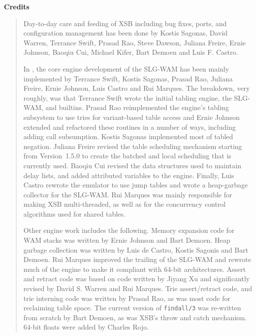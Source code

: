 \begin{center}
{\bf {\Large 
		Credits
}}
\end{center}


\begin{quote}
Day-to-day care and feeding of XSB including bug fixes, ports, and
configuration management has been done by Kostis Sagonas, David
Warren, Terrance Swift, Prasad Rao, Steve Dawson, Juliana Freire,
Ernie Johnson, Baoqiu Cui, Michael Kifer, Bart Demoen and Luis F.
Castro.

In \version, the core engine development of the SLG-WAM has been
mainly implemented by Terrance Swift, Kostis Sagonas, Prasad Rao,
Juliana Freire, Ernie Johnson, Luis Castro and Rui Marques.  The
breakdown, very roughly, was that Terrance Swift wrote the initial
tabling engine, the SLG-WAM, and builtins.  Prasad Rao reimplemented
the engine's tabling subsystem to use tries for variant-based table
access and Ernie Johnson extended and refactored these routines in a
number of ways, including adding call subsumption.  Kostis Sagonas
implemented most of tabled negation.  Juliana Freire revised the table
scheduling mechanism starting from Version~1.5.0 to create the batched
and local scheduling that is currently used.  Baoqiu Cui revised the
data structures used to maintain delay lists, and added attributed
variables to the engine.  Finally, Luis Castro rewrote the emulator to
use jump tables and wrote a heap-garbage collector for the SLG-WAM.
Rui Marques was mainly responsible for making XSB multi-threaded, as
well as for the concurrency control algorithms used for shared tables.

Other engine work includes the following.  Memory expansion code for
WAM stacks was written by Ernie Johnson and Bart Demoen.  Heap garbage
collection was written by Luis de Castro, Kostis Sagonis and Bart
Demoen.  Rui Marques improved the trailing of the SLG-WAM and rewrote
much of the engine to make it compliant with 64-bit architectures.
Assert and retract code was based on code written by Jiyang Xu and
significantly revised by David S. Warren and Rui Marques.  Trie
assert/retract code, and trie interning code was written by Prasad
Rao, as was most code for reclaiming table space. The current version
of {\tt findall/3} was re-written from scratch by Bart Demoen, as was
XSB's throw and catch mechanism.  64-bit floats were added by Charles
Rojo.


\end{quote}
